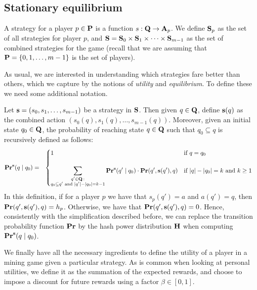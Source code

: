 \subsection{Stationary equilibrium}
A strategy for a player $p \in \mathbf{P}$ is a function $s : \mathbf{Q} \rightarrow \mathbf{A}_p$. 
We define $\mathbf{S}_p$ as the set of all strategies for player $p$, and $\mathbf{S} = \mathbf{S}_0 \times \mathbf{S}_{1} \times \cdots \times \mathbf{S}_{m-1}$ as the set of combined strategies for the game (recall that we are assuming that $\mathbf{P} = \{0, 1, \ldots, m-1\}$ is the set of players). 

As usual, we are interested in understanding which strategies fare better than others, which we capture by the notions of 
\emph{utility} and \emph{equilibrium}. To define these we need some additional notation. 

Let $\mathbf{s} = (s_0, s_1, \ldots, s_{m-1})$ be a strategy in $\mathbf{S}$. Then given $q \in \mathbf{Q}$, define $\mathbf{s}(q)$ as the combined action $(s_0(q), s_1(q), \ldots, s_{m-1}(q))$. Moreover, given an initial state $q_0 \in \mathbf{Q}$, 
the probability of reaching state $q \in \mathbf{Q}$ such that $q_0 \subseteq q$ is recursively defined as follows:
\begin{eqnarray*}
\mathbf{Pr}^{\mathbf{s}}(q \mid q_0) & = &
\begin{cases}
1 & \text{if } q =  q_0\\
& \\
{\displaystyle \sum_{\substack{q' \in \mathbf{Q} \,:\\ q_0 \subseteq q' \text{ and } |q'| - |q_0| = k-1}} \mathbf{Pr}^{\mathbf{s}}(q' \mid q_0) \cdot \mathbf{Pr}(q', \mathbf{s}(q'), q)}
 & \text{if } |q| - |q_0| = k \text{ and } k \geq 1
\end{cases}
\end{eqnarray*}
In this definition, if for a player $p$ we have that $s_p(q') = a$ and $a(q') = q$, then $\mathbf{Pr}(q', \mathbf{s}(q'), q) = h_p$. Otherwise, we have that $\mathbf{Pr}(q', \mathbf{s}(q'), q) = 0$. Hence, consistently with the simplification described before, we can replace the transition probability function $\mathbf{Pr}$ by the hash power distribution $\mathbf{H}$ when computing $\mathbf{Pr}^{\mathbf{s}}(q \mid q_0)$. 

We finally have all the necessary ingredients to define the utility of a player in a mining game given a particular strategy. As is common 
when looking at personal utilities, we define it as the summation of the expected rewards, and choose 
to impose a discount for future rewards using a factor $\beta \in [0,1]$. 


